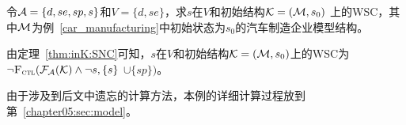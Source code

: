 \begin{example}
	\label{exam:SNCandWSC}
令${\cal A}=\{d,se,sp,s\}$和$V=\{d,se\}$，求$s$在$V$和初始结构${\cal K} = ({\cal M},s_0)$ 上的WSC，其中${\cal M}$为例~\ref{car_manufacturing}中初始状态为$s_0$的汽车制造企业模型结构。

由定理~\ref{thm:inK:SNC}可知，$s$在$V$和初始结构${\cal K} = ({\cal M},s_0)$上的WSC为$\neg {\textsc{F}_{\textsc{ctl}}}({\cal F}_{{\cal A}}({\cal K}) \wedge \neg s, \{s\}$ $\cup \{sp\})$。

由于涉及到后文中遗忘的计算方法，本例的详细计算过程放到第~\ref{chapter05:sec:model}。
%
%
%
%
%
%

\end{example}

